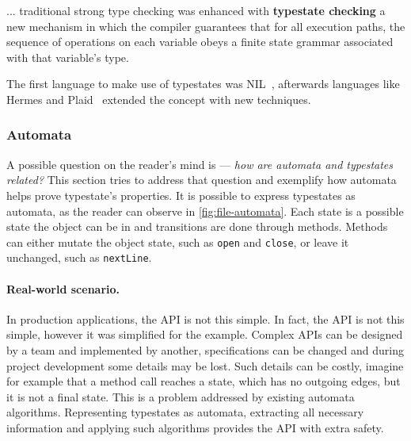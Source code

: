 \begin{displayquote}
    ... traditional strong type checking was enhanced with \textbf{typestate checking}
    a new mechanism in which the compiler guarantees that for all execution paths,
    the sequence of operations on each variable obeys a finite state grammar associated with that variable's type.
\end{displayquote}

The first language to make use of typestates was NIL~\autocite{Strom1983},
afterwards languages like Hermes and Plaid~\autocite{Aldrich2009}
extended the concept with new techniques.

\subsubsection*{Automata}

A possible question on the reader's mind is --- \emph{how are automata and typestates related?}
This section tries to address that question and exemplify how automata helps prove typestate's properties.
It is possible to express typestates as automata, as the reader can observe in \autoref{fig:file-automata}.
Each state is a possible state the object can be in and transitions are done through methods.
Methods can either mutate the object state, such as \texttt{open} and \texttt{close},
or leave it unchanged, such as \texttt{nextLine}.



\paragraph{Real-world scenario.}
In production applications, the \gls{API} is not this simple.
In fact, the  \gls{API} is not this simple, however it was simplified for the example.
Complex \gls{API}s can be designed by a team and implemented by another,
specifications can be changed and during project development some details may be lost.
Such details can be costly, imagine for example that a method call reaches a state, which has no outgoing edges,
but it is not a final state. This is a problem addressed by existing automata algorithms.
Representing typestates as automata, extracting all necessary information and applying such algorithms provides the \gls{API} with extra safety.

